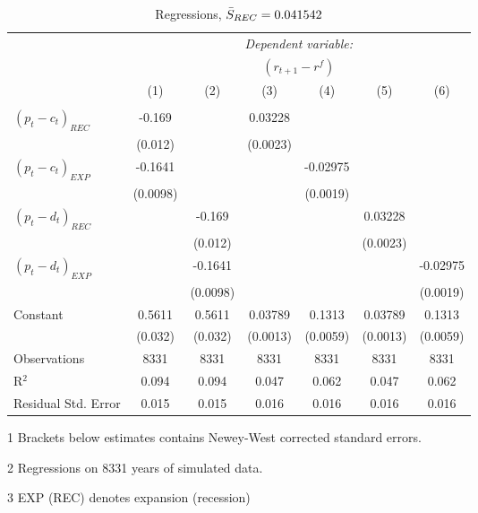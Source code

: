 \begin{table}[H]
\centering   
  \caption{Regressions, $\Bar{S}_{REC} = 0.041542$}           
  \label{tab:regress1}     
  \begin{threeparttable}
\begin{tabular}{@{\hspace{5pt}}l@{\hspace{5pt}}cccccc} 
\toprule 
 & \multicolumn{6}{c}{\textit{Dependent variable:}} \\ 
 & \multicolumn{6}{c}{$\left(r_{t+1}-r^f\right)$} \\ 
 \cmidrule(rr){2-7}
 & (1) & (2) & (3) & (4) & (5) & (6) \\ 
\midrule  
\\[-2.1ex] $\left( p_t - c_t \right)_{REC}$ &-0.169& &0.03228 & & &\\ 
  & (0.012) & &(0.0023) & & & \\ 
 \addlinespace 
  $\left( p_t - c_t \right)_{EXP}$ &-0.1641  &    & &-0.02975 & &  \\ 
  & (0.0098) & & &(0.0019) & & \\ 
 \addlinespace 
  $\left( p_t - d_t \right)_{REC}$ & &-0.169& & & 0.03228  &   \\ 
                                   & &  (0.012) & & & (0.0023) &    \\ 
 \addlinespace 
  $\left( p_t - d_t \right)_{EXP}$ & &   -0.1641& & & &-0.02975 \\ 
                                   & &  (0.0098) & & & &(0.0019) \\ 
 \addlinespace 
 Constant &0.5611 &0.5611&0.03789 &0.1313 &0.03789 &0.1313 \\ 
          &(0.032) &(0.032)&(0.0013)&(0.0059)&(0.0013)&(0.0059) \\ 
 \addlinespace 
\midrule  
Observations & 8331 & 8331&8331 & 8331&8331&8331\\
R$^{2}$ &0.094 & 0.094&0.047&0.062&0.047&0.062 \\ 
Residual Std. Error &0.015 & 0.015&0.016&0.016&0.016&0.016 \\ 
\bottomrule 
\end{tabular} 
\begin{tablenotes}
\footnotesize{
\item[1] Brackets below estimates contains Newey-West corrected standard errors. 
\item[2] Regressions on 8331 years of simulated data.
\item[3] EXP (REC) denotes expansion (recession)
}
\end{tablenotes}
\end{threeparttable}
\end{table} 
